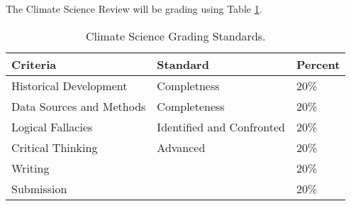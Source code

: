 The Climate Science Review will be grading using Table \ref{tab:climatesciencereviewgrading}. 

\begin{table}[h]
\caption{Climate Science Grading Standards.}
\label{tab:climatesciencereviewgrading}
\begin{tabular}{lll}\hline
Criteria                & Standard      & Percent \\
\hline\hline
Historical Development  & Completness   & 20\% \\
Data Sources and Methods  & Completeness  & 20\% \\
Logical Fallacies & Identified and Confronted   & 20\% \\
Critical Thinking & Advanced                    & 20\%\\
Writing           && 20\% \\
Submission        && 20\% \\
\hline
\end{tabular}
\end{table}

